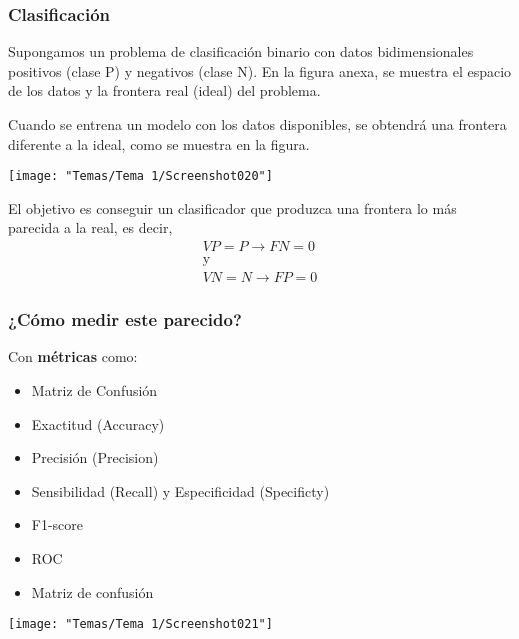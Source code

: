 \subsubsection{Clasificación}
\begin{minipage}{0.5\textwidth}
	Supongamos un problema de clasificación binario con datos bidimensionales positivos (clase P) y negativos (clase N). En la figura anexa, se muestra el espacio de los datos y la frontera real (ideal) del problema.
	
	\hspace{2cm}
	
	Cuando se entrena un modelo con los datos disponibles, se obtendrá una frontera diferente a la ideal, como se muestra en la figura.
\end{minipage}\qquad
\begin{minipage}{0.45\textwidth}
	\begin{center}
		\texttt{[image: "Temas/Tema 1/Screenshot020"]}
	\end{center}
\end{minipage}


El objetivo es conseguir un clasificador que produzca una frontera lo más parecida a la real, es decir, \[ \begin{array}{c}
	VP = P\longrightarrow FN=0\\
	\mathrm{y}\\
	VN=N\longrightarrow FP=0
\end{array} \]

\subsubsection*{¿Cómo medir este parecido?}
Con \textbf{métricas} como:
\begin{itemize}
	\item Matriz de Confusión
	\item Exactitud (Accuracy)
	\item Precisión (Precision)
	\item Sensibilidad (Recall) y Especificidad (Specificty)
	\item F1-score
	\item ROC
\end{itemize}

\begin{itemize}[label=\color{red}\textbullet, leftmargin=*]
	\item \color{lightblue}Matriz de confusión
\end{itemize}
\begin{center}
	\texttt{[image: "Temas/Tema 1/Screenshot021"]}
\end{center}

